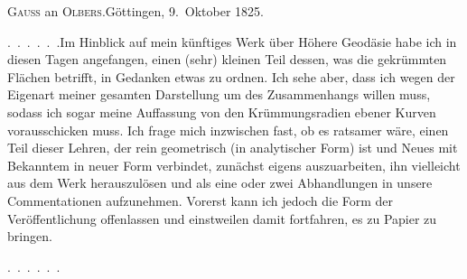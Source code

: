 \begin{center}
\textsc{Gauss} an \textsc{Olbers}.\quad Göttingen, 9.~Oktober 1825.
\end{center}

\par\noindent\hspace*{\parindent}\mbox{.\ .\ .\ .\ .\ .}\quad Im Hinblick auf mein künftiges Werk über Höhere Geodäsie habe ich in diesen Tagen angefangen, einen (sehr) kleinen Teil dessen, was die gekrümmten Flächen betrifft, in Gedanken etwas zu ordnen.
Ich sehe aber, dass ich wegen der Eigenart meiner gesamten Darstellung um des Zusammenhangs willen  muss, sodass ich sogar meine Auffassung von den Krümmungsradien ebener Kurven vorausschicken muss.
Ich frage mich inzwischen fast, ob es ratsamer wäre, einen Teil dieser Lehren, der rein geometrisch (in analytischer Form) ist und Neues mit Bekanntem in neuer Form verbindet, zunächst eigens auszuarbeiten, ihn vielleicht aus dem Werk herauszulösen und als eine oder zwei Abhandlungen in unsere Commentationen aufzunehmen.
Vorerst kann ich jedoch die Form der Veröffentlichung offenlassen und einstweilen damit fortfahren, es zu Papier zu bringen.
\par\nobreak\noindent\hspace*{\parindent}\mbox{.\ .\ .\ .\ .\ .}\par
